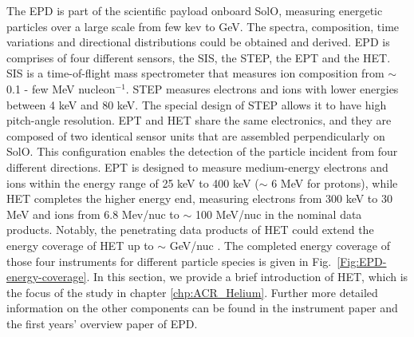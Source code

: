 The \ac{EPD} \citep{RodriguezPacheco-2019-EPD} is part of the scientific payload onboard \ac{SolO}, measuring energetic particles over a large scale from few kev to GeV. The spectra, composition, time variations and directional distributions could be obtained and derived.
\ac{EPD} is comprises of four different sensors, the \ac{SIS}, the \ac{STEP}, the \ac{EPT} and the \ac{HET}. 
\ac{SIS} is a time-of-flight mass spectrometer that measures ion composition from $\sim$ 0.1 - few MeV nucleon$^{-1}$. \ac{STEP} measures electrons and ions with lower energies between 4 keV and 80 keV. The special design of \ac{STEP} allows it to have high pitch-angle resolution.
\ac{EPT} and \ac{HET} share the same electronics, and they are composed of two identical sensor units that are assembled perpendicularly on \ac{SolO}. This configuration enables the detection of the particle incident from four different directions. \ac{EPT} is designed to measure medium-energy electrons and ions within the energy range of 25 keV to 400 keV ($\sim$ 6 MeV for protons), while \ac{HET} completes the higher energy end, measuring electrons from 300 keV to 30 MeV and ions from 6.8 Mev/nuc to $\sim$ 100 MeV/nuc in the nominal data products. Notably, the penetrating data products of \ac{HET} could extend the energy coverage of \ac{HET} up to $\sim$ GeV/nuc \citep{Elftmann-2020-PhD}.
The completed energy coverage of those four instruments for different particle species is given in Fig.~\ref{Fig:EPD-energy-coverage}.
In this section, we provide a brief introduction of \ac{HET}, which is the focus of the study in chapter \ref{chp:ACR_Helium}. Further more detailed information on the other components can be found in the instrument paper \citep{RodriguezPacheco-2019-EPD} and the first years' overview paper of \ac{EPD}\citep{Wimmer2021AA}.


